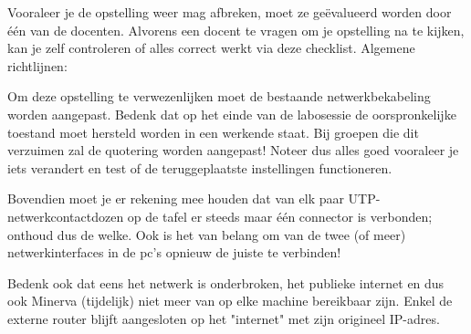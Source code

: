 \documentclass{report}
\begin{document}
Vooraleer je de opstelling weer mag afbreken, moet ze geëvalueerd worden door één van de docenten.
Alvorens een docent te vragen om je opstelling na te kijken, kan je zelf controleren of alles correct werkt via deze checklist.
Algemene richtlijnen:

Om deze opstelling te verwezenlijken moet de bestaande netwerkbekabeling worden aangepast.
Bedenk dat op het einde van de labosessie de oorspronkelijke toestand moet hersteld worden in een werkende staat.
Bij groepen die dit verzuimen zal de quotering worden aangepast!
Noteer dus alles goed vooraleer je iets verandert en test of de teruggeplaatste instellingen functioneren.

Bovendien moet je er rekening mee houden dat van elk paar UTP-netwerkcontactdozen op de tafel er steeds maar één connector is verbonden; onthoud dus de welke.
Ook is het van belang om van de twee (of meer) netwerkinterfaces in de pc's opnieuw de juiste te verbinden!

Bedenk ook dat eens het netwerk is onderbroken, het publieke internet en dus ook Minerva (tijdelijk) niet meer van op elke machine bereikbaar zijn.
Enkel de externe router blijft aangesloten op het "internet" met zijn origineel IP-adres. 
\end{document}
